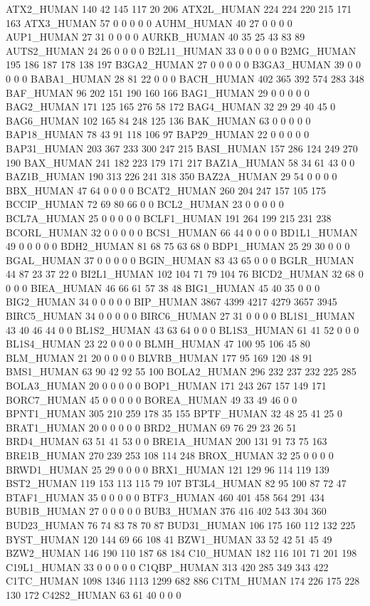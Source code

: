 ATX2_HUMAN	140	42	145	117	20	206
ATX2L_HUMAN	224	224	220	215	171	163
ATX3_HUMAN	57	0	0	0	0	0
AUHM_HUMAN	40	27	0	0	0	0
AUP1_HUMAN	27	31	0	0	0	0
AURKB_HUMAN	40	35	25	43	83	89
AUTS2_HUMAN	24	26	0	0	0	0
B2L11_HUMAN	33	0	0	0	0	0
B2MG_HUMAN	195	186	187	178	138	197
B3GA2_HUMAN	27	0	0	0	0	0
B3GA3_HUMAN	39	0	0	0	0	0
BABA1_HUMAN	28	81	22	0	0	0
BACH_HUMAN	402	365	392	574	283	348
BAF_HUMAN	96	202	151	190	160	166
BAG1_HUMAN	29	0	0	0	0	0
BAG2_HUMAN	171	125	165	276	58	172
BAG4_HUMAN	32	29	29	40	45	0
BAG6_HUMAN	102	165	84	248	125	136
BAK_HUMAN	63	0	0	0	0	0
BAP18_HUMAN	78	43	91	118	106	97
BAP29_HUMAN	22	0	0	0	0	0
BAP31_HUMAN	203	367	233	300	247	215
BASI_HUMAN	157	286	124	249	270	190
BAX_HUMAN	241	182	223	179	171	217
BAZ1A_HUMAN	58	34	61	43	0	0
BAZ1B_HUMAN	190	313	226	241	318	350
BAZ2A_HUMAN	29	54	0	0	0	0
BBX_HUMAN	47	64	0	0	0	0
BCAT2_HUMAN	260	204	247	157	105	175
BCCIP_HUMAN	72	69	80	66	0	0
BCL2_HUMAN	23	0	0	0	0	0
BCL7A_HUMAN	25	0	0	0	0	0
BCLF1_HUMAN	191	264	199	215	231	238
BCORL_HUMAN	32	0	0	0	0	0
BCS1_HUMAN	66	44	0	0	0	0
BD1L1_HUMAN	49	0	0	0	0	0
BDH2_HUMAN	81	68	75	63	68	0
BDP1_HUMAN	25	29	30	0	0	0
BGAL_HUMAN	37	0	0	0	0	0
BGIN_HUMAN	83	43	65	0	0	0
BGLR_HUMAN	44	87	23	37	22	0
BI2L1_HUMAN	102	104	71	79	104	76
BICD2_HUMAN	32	68	0	0	0	0
BIEA_HUMAN	46	66	61	57	38	48
BIG1_HUMAN	45	40	35	0	0	0
BIG2_HUMAN	34	0	0	0	0	0
BIP_HUMAN	3867	4399	4217	4279	3657	3945
BIRC5_HUMAN	34	0	0	0	0	0
BIRC6_HUMAN	27	31	0	0	0	0
BL1S1_HUMAN	43	40	46	44	0	0
BL1S2_HUMAN	43	63	64	0	0	0
BL1S3_HUMAN	61	41	52	0	0	0
BL1S4_HUMAN	23	22	0	0	0	0
BLMH_HUMAN	47	100	95	106	45	80
BLM_HUMAN	21	20	0	0	0	0
BLVRB_HUMAN	177	95	169	120	48	91
BMS1_HUMAN	63	90	42	92	55	100
BOLA2_HUMAN	296	232	237	232	225	285
BOLA3_HUMAN	20	0	0	0	0	0
BOP1_HUMAN	171	243	267	157	149	171
BORC7_HUMAN	45	0	0	0	0	0
BOREA_HUMAN	49	33	49	46	0	0
BPNT1_HUMAN	305	210	259	178	35	155
BPTF_HUMAN	32	48	25	41	25	0
BRAT1_HUMAN	20	0	0	0	0	0
BRD2_HUMAN	69	76	29	23	26	51
BRD4_HUMAN	63	51	41	53	0	0
BRE1A_HUMAN	200	131	91	73	75	163
BRE1B_HUMAN	270	239	253	108	114	248
BROX_HUMAN	32	25	0	0	0	0
BRWD1_HUMAN	25	29	0	0	0	0
BRX1_HUMAN	121	129	96	114	119	139
BST2_HUMAN	119	153	113	115	79	107
BT3L4_HUMAN	82	95	100	87	72	47
BTAF1_HUMAN	35	0	0	0	0	0
BTF3_HUMAN	460	401	458	564	291	434
BUB1B_HUMAN	27	0	0	0	0	0
BUB3_HUMAN	376	416	402	543	304	360
BUD23_HUMAN	76	74	83	78	70	87
BUD31_HUMAN	106	175	160	112	132	225
BYST_HUMAN	120	144	69	66	108	41
BZW1_HUMAN	33	52	42	51	45	49
BZW2_HUMAN	146	190	110	187	68	184
C10_HUMAN	182	116	101	71	201	198
C19L1_HUMAN	33	0	0	0	0	0
C1QBP_HUMAN	313	420	285	349	343	422
C1TC_HUMAN	1098	1346	1113	1299	682	886
C1TM_HUMAN	174	226	175	228	130	172
C42S2_HUMAN	63	61	40	0	0	0

